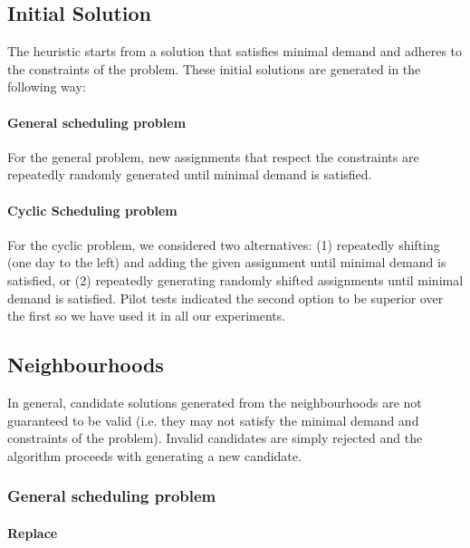 \documentclass[]{article}
\begin{document}
\subsection{Initial Solution}

The heuristic starts from a solution that satisfies minimal demand and adheres to the constraints of the problem. These initial solutions are generated in the following way:

\label{subsec:initial}

\paragraph{General scheduling problem}

For the general problem, new assignments that respect the constraints are repeatedly randomly generated until minimal demand is satisfied.

\paragraph{Cyclic Scheduling problem}

For the cyclic problem, we considered two alternatives: (1) repeatedly shifting (one day to the left) and adding the given assignment until minimal demand is satisfied, or (2) repeatedly generating randomly shifted assignments until minimal demand is satisfied. Pilot tests indicated the second option to be superior over the first so we have used it in all our experiments.

\subsection{Neighbourhoods}

\label{subsec:neighbourhoods}

In general, candidate solutions generated from the neighbourhoods are not guaranteed to be valid (i.e. they may not satisfy the minimal demand and constraints of the problem). Invalid candidates are simply rejected and the algorithm proceeds with generating a new candidate.


\subsubsection{General scheduling problem}
\paragraph{Replace}
\end{document}
